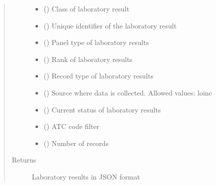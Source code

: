 \documentclass[letterpaper,10pt,english]{sphinxmanual}
\begin{document}
\begin{fulllineitems}
\begin{fulllineitems}
\begin{quote}
\begin{description}
\begin{itemize}
\item {} 
\sphinxAtStartPar
{} () \textendash{} Class of laboratory result

\item {} 
\sphinxAtStartPar
{} () \textendash{} Unique identifier of the laboratory result

\item {} 
\sphinxAtStartPar
{} () \textendash{} Panel type of laboratory results

\item {} 
\sphinxAtStartPar
{} () \textendash{} Rank of laboratory results

\item {} 
\sphinxAtStartPar
{} () \textendash{} Record type of laboratory results

\item {} 
\sphinxAtStartPar
{} () \textendash{} Source where data is collected. Allowed values: loinc

\item {} 
\sphinxAtStartPar
{} () \textendash{} Current status of laboratory results

\item {} 
\sphinxAtStartPar
{} () \textendash{} ATC code filter

\item {} 
\sphinxAtStartPar
{} () \textendash{} Number of records

\end{itemize}

\item[{Returns}] \leavevmode
\sphinxAtStartPar
Laboratory results in JSON format


\end{description}
\end{quote}
\end{fulllineitems}
\end{fulllineitems}
\end{document}
